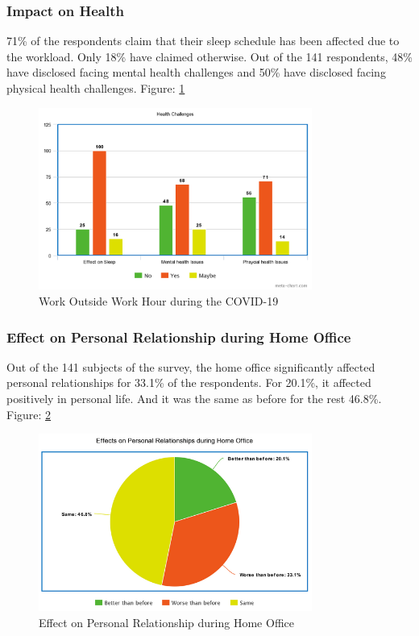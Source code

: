 \documentclass[11pt]{article}
\begin{document}
\subsubsection{Impact on Health}
71\% of the respondents claim that their sleep schedule has been affected due to the workload. Only 18\% have claimed otherwise. Out of the 141 respondents, 48\% have disclosed facing mental health challenges and 50\% have disclosed facing physical health challenges. Figure: \ref{Impact on Health during COVID 19}
\newpage
\begin{figure}[!ht]
	\centering
	\includegraphics[width=0.8\textwidth]{Images/Work Life/Health Challenges.png}
	\caption{Work Outside Work Hour during the COVID-19}
	\centering
	\label{Impact on Health during COVID 19}
\end{figure}

\subsubsection{Effect on Personal Relationship during Home Office}
Out of the 141 subjects of the survey, the home office significantly affected personal relationships for 33.1\%  of the respondents. For 20.1\%, it affected positively in personal life. And it was the same as before for the rest 46.8\%. Figure: \ref{Effect on Personal Relationship}
\begin{figure}[!ht]
	\centering
	\includegraphics[width=0.8\textwidth]{Images/Work Life/Personal Relations.png}
	\caption{Effect on Personal Relationship during Home Office}
	\centering
	\label{Effect on Personal Relationship}
\end{figure}
\end{document}
